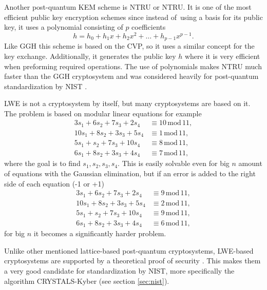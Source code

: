 Another post-quantum KEM scheme is NTRU or \acl{NTRU}. It is one of the most efficient public key encryption schemes since instead of~using a basis for its public key, it uses a polynomial consisting of $p$ coefficients
\begin{equation}
  h=h_0+h_1x+h_2x^2+\dots+h_{p-1}x^{p-1}.
\end{equation}
Like GGH this scheme is based on the CVP, so it uses a similar concept for the key exchange. Additionally, it generates the public key $h$ where it is very efficient when preforming required operations. The use of polynomials makes NTRU much faster than the GGH cryptosystem and was considered heavily for post-quantum standardization by NIST \cite{Bernstein149}.

LWE is not a cryptosystem by itself, but many cryptosystems are based on it. The problem is based on modular linear equations for example
\begin{align}
  3s_1+6s_2+7s_3+2s_4  & \equiv 10\,\mathrm{mod}\,11, \\
  10s_1+8s_2+3s_3+5s_4 & \equiv 1\,\mathrm{mod}\,11,  \\
  5s_1+s_2+7s_3+10s_4  & \equiv 8\,\mathrm{mod}\,11,  \\
  6s_1+8s_2+3s_3+4s_4  & \equiv 7\,\mathrm{mod}\,11,
\end{align}
where the goal is to find $s_1, s_2, s_3, s_4$. This is easily solvable even for big $n$ amount of equations with the Gaussian elimination, but if an error is added to the right side of each equation (-1 or +1)
\begin{align}
  3s_1+6s_2+7s_3+2s_4  & \equiv 9\,\mathrm{mod}\,11, \\
  10s_1+8s_2+3s_3+5s_4 & \equiv 2\,\mathrm{mod}\,11, \\
  5s_1+s_2+7s_3+10s_4  & \equiv 9\,\mathrm{mod}\,11, \\
  6s_1+8s_2+3s_3+4s_4  & \equiv 6\,\mathrm{mod}\,11,
\end{align}
for big $n$ it becomes a significantly harder problem. \cite{Regev2005}

Unlike other mentioned lattice-based post-quantum cryptosystems, LWE-based cryptosystems are supported by a theoretical proof of security \cite{Bernstein2009}. This makes them a very good candidate for standardization by NIST, more specifically the algorithm CRYSTALS-Kyber (see section \ref{sec:nist}).
